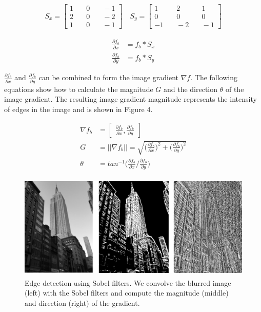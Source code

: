 \documentclass[runningheads]{llncs}
\begin{document}
\begin{align}
S_x = \begin{bmatrix} 
1 & \quad 0 & \quad -1 \\ 
2 & \quad 0 & \quad -2 \\ 
1 & \quad 0 & \quad -1  
\end{bmatrix}
\quad S_y = \begin{bmatrix} 
1 & \quad 2 & \quad 1 \\ 
0 & \quad 0 & \quad 0 \\ 
-1 & \quad -2 & \quad -1  
\end{bmatrix}
\end{align}

\begin{align}
\frac{\partial f_b}{\partial x} &= f_b * S_x \\
\frac{\partial f_b}{\partial y} &= f_b * S_y
\end{align}

$\frac{\partial f_b}{\partial x}$ and $\frac{\partial f_b}{\partial y}$ can be combined to form the image gradient $\nabla f$. The following equations show how to calculate the magnitude $G$ and the direction $\theta$ of the image gradient. The resulting image gradient magnitude represents the intensity of edges in the image and is shown in Figure 4.

\begin{align}
\nabla f_b &= \begin{bmatrix} \frac{\partial f_b}{\partial x}, \frac{\partial f_b}{\partial y} \end{bmatrix} \\
G &= \vert \vert \nabla f_b \vert \vert = \sqrt{\Big( \frac{\partial f_b}{\partial x} \Big)^2 + \Big( \frac{\partial f_b}{\partial y} \Big)^2} \\
\theta &= tan^{-1} \Big(\frac{\partial f_b}{\partial x} / \frac{\partial f_b}{\partial y})
\end{align}

\begin{figure}
\centering
\includegraphics[height=5cm]{images/edge.png}
\caption{Edge detection using Sobel filters. We convolve the blurred image (left) with the Sobel filters and compute the magnitude (middle) and direction (right) of the gradient.}
\label{fig:example}
\end{figure}
\end{document}

